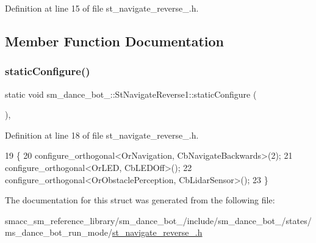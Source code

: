 Definition at line 15 of file st\+\_\+navigate\+\_\+reverse\+\_.\+h.



\subsection{Member Function Documentation}
\mbox{\label{structsm__dance__bot__2_1_1StNavigateReverse1_a15d3a1e5f83f03d54113e4d9e7ec7aac}} 
\subsubsection{\texorpdfstring{static\+Configure()}{staticConfigure()}}
{\footnotesize\ttfamily static void sm\+\_\+dance\+\_\+bot\+\_\+::\+St\+Navigate\+Reverse1\+::static\+Configure (\begin{DoxyParamCaption}{ }\end{DoxyParamCaption})\hspace{0.3cm}{\ttfamily [inline]}, {\ttfamily [static]}}



Definition at line 18 of file st\+\_\+navigate\+\_\+reverse\+\_.\+h.


\begin{DoxyCode}
19    \{
20       configure\_orthogonal<OrNavigation, CbNavigateBackwards>(2);
21       configure\_orthogonal<OrLED, CbLEDOff>();
22       configure\_orthogonal<OrObstaclePerception, CbLidarSensor>();
23    \}
\end{DoxyCode}


The documentation for this struct was generated from the following file\+:\begin{DoxyCompactItemize}
\item 
smacc\+\_\+sm\+\_\+reference\+\_\+library/sm\+\_\+dance\+\_\+bot\+\_/include/sm\+\_\+dance\+\_\+bot\+\_/states/ms\+\_\+dance\+\_\+bot\+\_\+run\+\_\+mode/\hyperlink{2_2include_2sm__dance__bot__2_2states_2ms__dance__bot__run__mode_2st__navigate__reverse__1_8h}{st\+\_\+navigate\+\_\+reverse\+\_.\+h}\end{DoxyCompactItemize}

